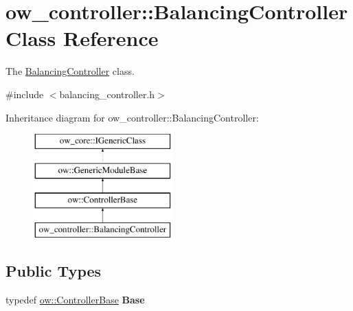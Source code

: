\hypertarget{classow__controller_1_1BalancingController}{}\section{ow\+\_\+controller\+:\+:Balancing\+Controller Class Reference}
\label{classow__controller_1_1BalancingController}


The \hyperlink{classow__controller_1_1BalancingController}{Balancing\+Controller} class.  




{\ttfamily \#include $<$balancing\+\_\+controller.\+h$>$}

Inheritance diagram for ow\+\_\+controller\+:\+:Balancing\+Controller\+:\begin{figure}[H]
\begin{center}
\leavevmode
\includegraphics[height=4.000000cm]{dc/daf/classow__controller_1_1BalancingController}
\end{center}
\end{figure}
\subsection*{Public Types}
\begin{DoxyCompactItemize}
\item 
typedef \hyperlink{classow_1_1ControllerBase}{ow\+::\+Controller\+Base} {\bfseries Base}\hypertarget{classow__controller_1_1BalancingController_a160f88060cad795f981f566864ecfb8f}{}\label{classow__controller_1_1BalancingController_a160f88060cad795f981f566864ecfb8f}

\end{DoxyCompactItemize}
